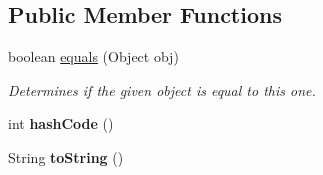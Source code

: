 \subsection*{Public Member Functions}
\begin{DoxyCompactItemize}
\item 
boolean \hyperlink{classedu_1_1udel_1_1cis_1_1vsl_1_1civl_1_1state_1_1common_1_1immutable_1_1ImmutableDynamicScope_a18b4e914e85f27fa0080a0e49beb3a64}{equals} (Object obj)
\begin{DoxyCompactList}\small\item\em Determines if the given object is equal to this one. \end{DoxyCompactList}\item 
\hypertarget{classedu_1_1udel_1_1cis_1_1vsl_1_1civl_1_1state_1_1common_1_1immutable_1_1ImmutableDynamicScope_af47871251b839e8ae0215fb9912a4f33}{}int {\bfseries hash\+Code} ()\label{classedu_1_1udel_1_1cis_1_1vsl_1_1civl_1_1state_1_1common_1_1immutable_1_1ImmutableDynamicScope_af47871251b839e8ae0215fb9912a4f33}

\item 
\hypertarget{classedu_1_1udel_1_1cis_1_1vsl_1_1civl_1_1state_1_1common_1_1immutable_1_1ImmutableDynamicScope_a13ace8a52ea54d2be1e988969a07815b}{}String {\bfseries to\+String} ()\label{classedu_1_1udel_1_1cis_1_1vsl_1_1civl_1_1state_1_1common_1_1immutable_1_1ImmutableDynamicScope_a13ace8a52ea54d2be1e988969a07815b}


\end{DoxyCompactItemize}
